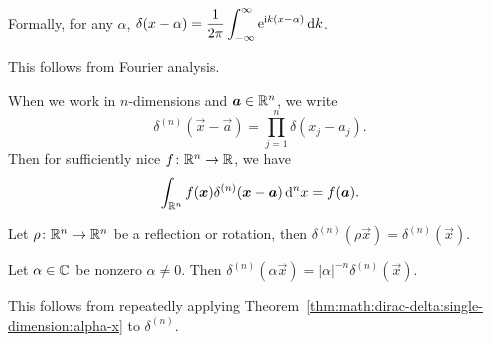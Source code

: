 \begin{theorem}
Formally, for any $\alpha$, $\displaystyle\delta(x-\alpha)=\frac{1}{2\pi}\int^{\infty}_{-\infty}\mathrm{e}^{\mathrm{i} k(x-\alpha)}\,\mathrm{d} k$.
\end{theorem}

This follows from Fourier analysis.

When we work in $n$-dimensions and $\boldsymbol{a}\in\mathbb{R}^{n}$, we write
\begin{equation}
\delta^{(n)}(\vec{x}-\vec{a}) = \prod^{n}_{j=1}\delta(x_{j}-a_{j}).
\end{equation}
Then for sufficiently nice $f\colon\mathbb{R}^{n}\to\mathbb{R}$, we have
\begin{equation}
\int_{\mathbb{R}^{n}}f(\boldsymbol{x})\delta^{(n)}(\boldsymbol{x}-\boldsymbol{a})\,\mathrm{d}^{n}x=f(\boldsymbol{a}).
\end{equation}

\begin{theorem}
Let $\rho\colon\mathbb{R}^{n}\to\mathbb{R}^{n}$ be a reflection or rotation,
then $\delta^{(n)}(\rho\vec{x})=\delta^{(n)}(\vec{x})$.
\end{theorem}

\begin{theorem}
Let $\alpha\in\mathbb{C}$ be nonzero $\alpha\neq0$.
Then $\delta^{(n)}(\alpha\vec{x})=|\alpha|^{-n}\delta^{(n)}(\vec{x})$.
\end{theorem}

This follows from repeatedly applying
Theorem~\ref{thm:math:dirac-delta:single-dimension:alpha-x}
to $\delta^{(n)}$.